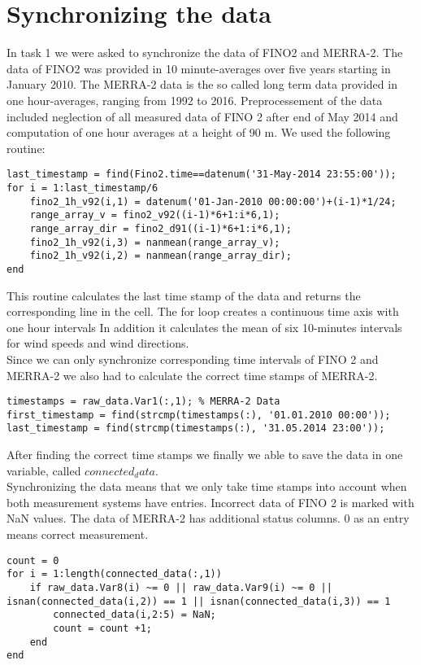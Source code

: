 \documentclass[10pt]{article}
\begin{document}
\section{Synchronizing the data}
In task 1 we were asked to synchronize the data of FINO2 and MERRA-2. The data of FINO2 was provided in 10 minute-averages over five years starting in January 2010. The MERRA-2 data is the so called long term data provided in one hour-averages, ranging from 1992 to 2016.
Preprocessement of the data included neglection of all measured data of FINO 2 after end of May 2014 and computation of one hour averages at a height of 90 m.
We used the following routine:
\begin{lstlisting}
last_timestamp = find(Fino2.time==datenum('31-May-2014 23:55:00'));
for i = 1:last_timestamp/6
    fino2_1h_v92(i,1) = datenum('01-Jan-2010 00:00:00')+(i-1)*1/24;
    range_array_v = fino2_v92((i-1)*6+1:i*6,1);
    range_array_dir = fino2_d91((i-1)*6+1:i*6,1);
    fino2_1h_v92(i,3) = nanmean(range_array_v);
    fino2_1h_v92(i,2) = nanmean(range_array_dir);
end
\end{lstlisting}
This routine calculates the last time stamp of the data and returns the corresponding line in the cell. The for loop creates a continuous time axis with one hour intervals  In addition it calculates the mean of six 10-minutes intervals for wind speeds and wind directions.\\
Since we can only synchronize corresponding time intervals of FINO 2 and MERRA-2 we also had to calculate the correct time stamps of MERRA-2. 
\begin{lstlisting}
timestamps = raw_data.Var1(:,1); % MERRA-2 Data
first_timestamp = find(strcmp(timestamps(:), '01.01.2010 00:00'));
last_timestamp = find(strcmp(timestamps(:), '31.05.2014 23:00'));
\end{lstlisting}
After finding the correct time stamps we finally we able to save the data in one variable, called $connected_data$.\\
Synchronizing the data means that we only take time stamps into account when both measurement systems have entries. Incorrect data of FINO 2 is marked with NaN values. The data of MERRA-2 has additional status columns. $0$ as an entry means correct measurement.
\begin{lstlisting}
count = 0 
for i = 1:length(connected_data(:,1))
    if raw_data.Var8(i) ~= 0 || raw_data.Var9(i) ~= 0 || isnan(connected_data(i,2)) == 1 || isnan(connected_data(i,3)) == 1
        connected_data(i,2:5) = NaN;
        count = count +1;
    end
end
\end{lstlisting}
\end{document}
